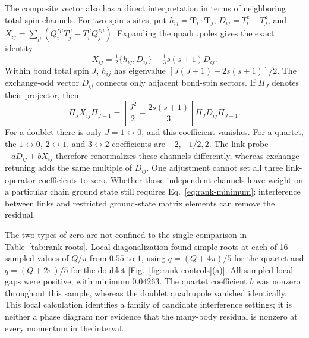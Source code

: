 The composite vector also has a direct interpretation in terms of neighboring
total-spin channels. For two spin-$s$ sites, put
$h_{ij}=\bm T_i\cdot\bm T_j$, $D_{ij}=T_i^z-T_j^z$, and
$X_{ij}=\sum_\mu(Q_i^{z\mu}T_j^\mu-T_i^\mu Q_j^{z\mu})$.
Expanding the quadrupoles gives the exact identity
\begin{equation}
 X_{ij}=\tfrac12\{h_{ij},D_{ij}\}+\tfrac13s(s+1)D_{ij}.
 \label{eq:bond-identity}
\end{equation}
Within bond total spin $J$, $h_{ij}$ has eigenvalue
$[J(J+1)-2s(s+1)]/2$. The exchange-odd vector $D_{ij}$ connects only
adjacent bond-spin sectors. If $\Pi_J$ denotes their projector, then
\begin{equation}
 \Pi_J X_{ij}\Pi_{J-1}=
 \left[\frac{J^2}{2}-\frac{2s(s+1)}{3}\right]
 \Pi_J D_{ij}\Pi_{J-1}.
 \label{eq:bond-channel}
\end{equation}
For a doublet there is only $J=1\leftrightarrow0$, and this coefficient
vanishes. For a quartet, the $1\leftrightarrow0$, $2\leftrightarrow1$,
and $3\leftrightarrow2$ coefficients are $-2,-1/2,2$.
The link probe $-aD_{ij}+bX_{ij}$ therefore renormalizes these channels
differently, whereas exchange retuning adds the same multiple of $D_{ij}$.
One adjustment cannot set all three link-operator coefficients to zero.
Whether those independent channels leave weight on a particular chain ground
state still requires Eq.~\eqref{eq:rank-minimum}: interference between links
and restricted ground-state matrix elements can remove the residual.

The two types of zero are not confined to the single comparison in
Table~\ref{tab:rank-roots}. Local diagonalization found simple roots at each
of 16 sampled values of $Q/\pi$ from $0.55$ to $1$, using
$q=(Q+4\pi)/5$ for the quartet and $q=(Q+2\pi)/5$ for the doublet
[Fig.~\ref{fig:rank-controls}(a)]. All sampled local gaps were positive,
with minimum $0.04263$. The quartet coefficient $b$ was nonzero throughout
this sample, whereas the doublet quadrupole vanished identically.
This local calculation identifies a family of candidate interference settings;
it is neither a phase diagram nor evidence that the many-body residual is
nonzero at every momentum in the interval.
